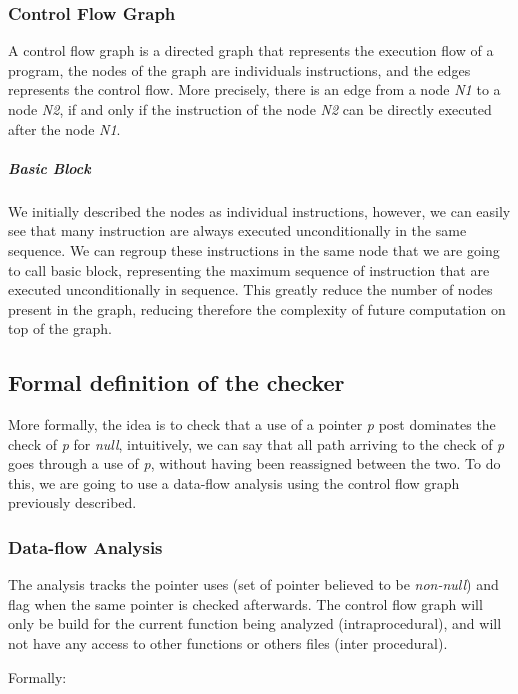 \subsubsection{Control Flow Graph}
\label{subsubsec:control_flow_graph}

A control flow graph is a directed graph that represents the execution flow of a program, the nodes of the graph are individuals instructions, and the edges represents the control flow. More precisely, there is an edge from a node \emph{N1} to a node \emph{N2}, if and only if the instruction of the node \emph{N2} can be directly executed after the node \emph{N1}.


\subparagraph{Basic Block}
We initially described the nodes as individual instructions, however, we can easily see that many instruction are always executed unconditionally in the same sequence.
We can regroup these instructions in the same node that we are going to call basic block, representing the maximum sequence of instruction that are executed unconditionally in sequence. 
This greatly reduce the number of nodes present in the graph, reducing therefore the complexity of future computation on top of the graph.

\subsection{Formal definition of the checker}
\label{subsec:checker_formal_definition}
More formally, the idea is to check that a use of a pointer \emph{p} post dominates the check of \emph{p} for \emph{null}, intuitively, we can say that all path arriving to the check of \emph{p} goes through a use of \emph{p}, without having been reassigned between the two. 
To do this, we are going to use a data-flow analysis using the control flow graph previously described.

\subsubsection{Data-flow Analysis}
\label{subsubsec:data_flow_analysis}

The analysis tracks the pointer uses (set of pointer believed to be \emph{non-null}) and flag when the same pointer is checked afterwards. 
The control flow graph will only be build for the current function being analyzed (intraprocedural), and will not have any access to other functions or others files (inter procedural).

Formally:

